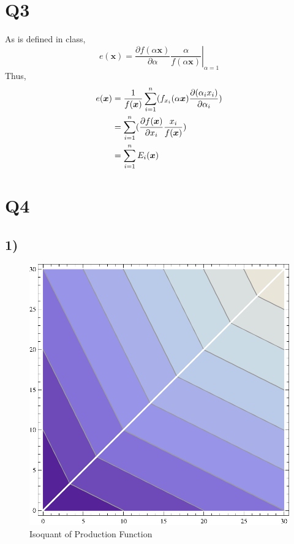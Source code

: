 \documentclass{article}
\begin{document}
\section*{Q3}
As is defined in class,
\begin{equation}
	e(\bm{x}) = \left.\frac{\partial f(\alpha \bm{x})}{\partial {\alpha}} \frac{\alpha}{f(\alpha \bm{x})}\right|_{\alpha=1}
\end{equation}
Thus,
\begin{align} \notag
	e(\bm{x}) &= \frac{1}{f(\bm{x})} \sum _{i=1}^{n}(f_{x_i}(\alpha \bm{x})\frac{\partial{(\alpha_i x_i)}}{\partial \alpha_i})\\ \notag
	& = \sum _ {i=1}^{n} (\frac{\partial f(\bm{x})}{\partial x_i}\frac{x_i}{f(\bm{x})}) \\
	& = \sum _{i=1}^{n} E_i(\bm{x})
\end{align}
\rightline{$\blacksquare$}
\section*{Q4}
\subsection*{1)}
\begin{figure}[!h]
\centering
\includegraphics[width=0.5\linewidth]{AMIE2014Fa3.eps}
\caption{Isoquant of Production Function}
\end{figure}
\end{document}
